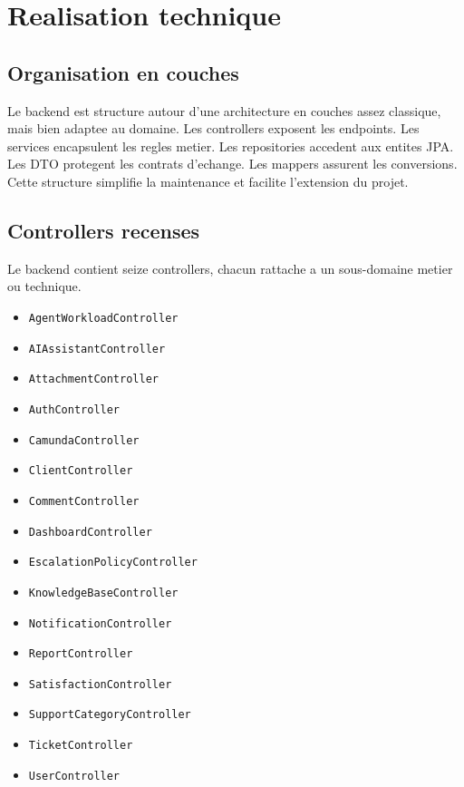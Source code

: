 ﻿\chapter{Realisation technique}

\section{Organisation en couches}

Le backend est structure autour d'une architecture en couches assez classique, mais bien adaptee au domaine. Les controllers exposent les endpoints. Les services encapsulent les regles metier. Les repositories accedent aux entites JPA. Les DTO protegent les contrats d'echange. Les mappers assurent les conversions. Cette structure simplifie la maintenance et facilite l'extension du projet.

\section{Controllers recenses}

Le backend contient seize controllers, chacun rattache a un sous-domaine metier ou technique.

\begin{itemize}[leftmargin=1.2cm]
  \item \texttt{AgentWorkloadController}
  \item \texttt{AIAssistantController}
  \item \texttt{AttachmentController}
  \item \texttt{AuthController}
  \item \texttt{CamundaController}
  \item \texttt{ClientController}
  \item \texttt{CommentController}
  \item \texttt{DashboardController}
  \item \texttt{EscalationPolicyController}
  \item \texttt{KnowledgeBaseController}
  \item \texttt{NotificationController}
  \item \texttt{ReportController}
  \item \texttt{SatisfactionController}
  \item \texttt{SupportCategoryController}
  \item \texttt{TicketController}
  \item \texttt{UserController}
\end{itemize}

